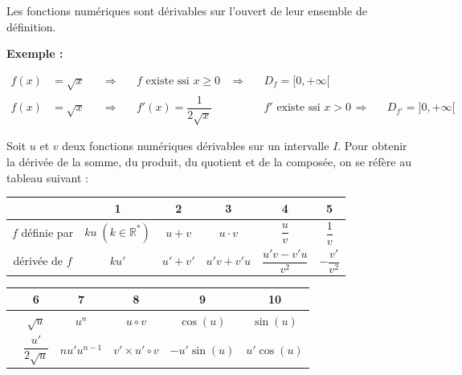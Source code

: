 \documentclass[12pt,a4paper]{article}
\begin{document}
\begin{tcolorbox}[
    colback=green!5,
    colframe=green!60!black,
    colbacktitle=green!60!black,
    title=\textbf{Remarque :},
    fonttitle=\bfseries,
    boxrule=0.8pt
]

Les fonctions numériques sont dérivables sur l'ouvert de leur
ensemble de définition.

\end{tcolorbox}

\textbf{Exemple :}

\[
\begin{aligned}
f(x)&=\sqrt{x}
&\quad\Longrightarrow\quad&
f\text{ existe ssi }x\geq0
&\quad\Longrightarrow\quad&
D_f=[0,+\infty[
\\[2mm]
f(x)&=\sqrt{x}
&\quad\Longrightarrow\quad&
f'(x)=\dfrac{1}{2\sqrt{x}}
&\quad&
f'\text{ existe ssi }x>0
&\quad\Longrightarrow\quad&
\boxed{D_{f'}=]0,+\infty[}
\end{aligned}
\]

\begin{tcolorbox}[
    colback=green!5,
    colframe=green!60!black,
    colbacktitle=green!60!black,
    title=\textbf{3 - Opérations sur les dérivées},
    fonttitle=\bfseries,
    boxrule=0.8pt
]

Soit $u$ et $v$ deux fonctions numériques dérivables sur un intervalle
$I$. Pour obtenir la dérivée de la somme, du produit, du quotient et
de la composée, on se réfère au tableau suivant :

\vspace{3mm}

\begin{center}
\renewcommand{\arraystretch}{1.3}

\begin{tabular}{|c|c|c|c|c|c|}
\hline
& 1 & 2 & 3 & 4 & 5
\\
\hline

$f$ définie par
&
$ku\;(k\in\mathbb{R}^*)$
&
$u+v$
&
$u\cdot v$
&
$\dfrac{u}{v}$
&
$\dfrac{1}{v}$
\\
\hline

dérivée de $f$
&
$ku'$
&
$u'+v'$
&
$u'v+v'u$
&
$\dfrac{u'v- v'u}{v^2}$
&
$-\dfrac{v'}{v^2}$
\\
\hline

\end{tabular}

\vspace{6mm}

\begin{tabular}{|c|c|c|c|c|c|}
\hline
& 6 & 7 & 8 & 9 & 10
\\
\hline

&
$\sqrt{u}$
&
$u^n$
&
$u\circ v$
&
$\cos(u)$
&
$\sin(u)$
\\
\hline

&
$\dfrac{u'}{2\sqrt{u}}$
&
$nu'u^{n-1}$
&
$v'\times u'\circ v$
&
$-u'\sin(u)$
&
$u'\cos(u)$
\\
\hline

\end{tabular}

\end{center}

\end{tcolorbox}
\end{document}
